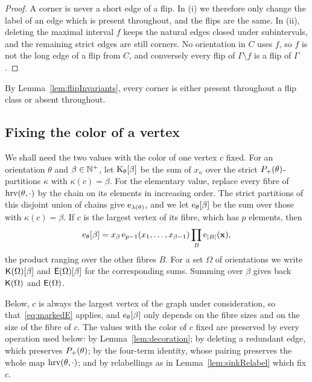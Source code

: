 \begin{proof}
A corner is never a short edge of a flip.
In (i) we therefore only change the label of an edge which is present
throughout, and the flips are the same.
In (ii), deleting the maximal interval $f$ keeps the natural edges closed under
subintervals, and the remaining strict edges are still corners.
No orientation in $C$ uses $f$, so $f$ is not the long edge of a flip from $C$,
and conversely every flip of $\Gamma\setminus f$ is a flip of $\Gamma$.
\end{proof}

By Lemma~\ref{lem:flipInvariants}, every corner is either present throughout
a flip class or absent throughout.

\subsection{Fixing the color of a vertex}

We shall need the two values with the color of one vertex $c$ fixed.
For an orientation $\theta$ and $\beta\in\mathbb{N}^{+}$, let
$\mathrm{K}_\theta[\beta]$ be the sum of $x_\kappa$ over the strict
$P_{+}(\theta)$-partitions $\kappa$ with $\kappa(c)=\beta$.
For the elementary value, replace every fibre of $\operatorname{hrv}(\theta,\cdot)$ by the
chain on its elements in increasing order.
The strict partitions of this disjoint union of chains give
$\mathrm{e}_{\lambda(\theta)}$, and we let $\mathrm{e}_\theta[\beta]$ be the sum over
those with $\kappa(c)=\beta$.
If $c$ is the largest vertex of its fibre, which has $p$ elements, then
\begin{equation}\label{eq:markedE}
 \mathrm{e}_\theta[\beta]
 =x_\beta\,\mathrm{e}_{p-1}(x_1,\dotsc,x_{\beta-1})
  \prod_{B}\mathrm{e}_{|B|}(\mathbf{x}),
\end{equation}
the product ranging over the other fibres $B$.
For a set $\Omega$ of orientations we write $\mathsf{K}(\Omega)[\beta]$ and $\mathsf{E}(\Omega)[\beta]$ for the
corresponding sums.
Summing over $\beta$ gives back $\mathsf{K}(\Omega)$ and $\mathsf{E}(\Omega)$.

Below, $c$ is always the largest vertex of the graph under consideration, so
that~\eqref{eq:markedE} applies, and $\mathrm{e}_\theta[\beta]$ only depends on
the fibre sizes and on the size of the fibre of $c$.
The values with the color of $c$ fixed are preserved by every operation used
below: by
Lemma~\ref{lem:decoration}; by deleting a redundant edge, which preserves
$P_{+}(\theta)$; by the four-term identity, whose pairing preserves the whole
map $\operatorname{hrv}(\theta,\cdot)$; and by relabellings as in Lemma~\ref{lem:sinkRelabel}
which fix $c$.


